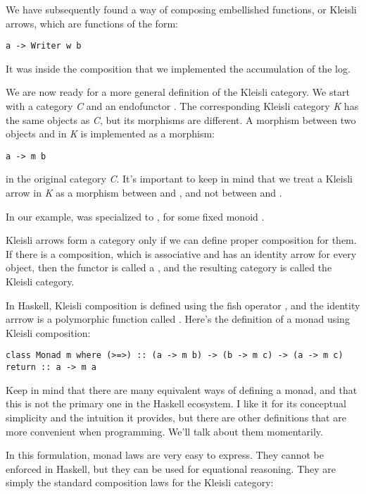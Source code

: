 We have subsequently found a way of composing embellished functions, or
Kleisli arrows, which are functions of the form:

\begin{verbatim}
a -> Writer w b
\end{verbatim}

It was inside the composition that we implemented the accumulation of
the log.

We are now ready for a more general definition of the Kleisli category.
We start with a category \emph{C} and an endofunctor . The
corresponding Kleisli category \emph{K} has the same objects as
\emph{C}, but its morphisms are different. A morphism between two
objects  and  in \emph{K} is implemented as a
morphism:

\begin{verbatim}
a -> m b
\end{verbatim}

in the original category \emph{C}. It's important to keep in mind that
we treat a Kleisli arrow in \emph{K} as a morphism between 
and , and not between  and .

In our example,  was specialized to , for
some fixed monoid .

Kleisli arrows form a category only if we can define proper composition
for them. If there is a composition, which is associative and has an
identity arrow for every object, then the functor  is called a
, and the resulting category is called the Kleisli category.

In Haskell, Kleisli composition is defined using the fish operator
\code{\textgreater{}=\textgreater{}}, and the identity arrrow is a
polymorphic function called . Here's the definition of a
monad using Kleisli composition:

\begin{verbatim}
class Monad m where (>=>) :: (a -> m b) -> (b -> m c) -> (a -> m c) return :: a -> m a
\end{verbatim}

Keep in mind that there are many equivalent ways of defining a monad,
and that this is not the primary one in the Haskell ecosystem. I like it
for its conceptual simplicity and the intuition it provides, but there
are other definitions that are more convenient when programming. We'll
talk about them momentarily.

In this formulation, monad laws are very easy to express. They cannot be
enforced in Haskell, but they can be used for equational reasoning. They
are simply the standard composition laws for the Kleisli category:

